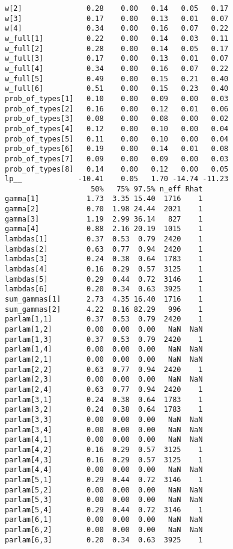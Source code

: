 \documentclass[
  12pt,
]{book}
\begin{document}
\begin{verbatim}
w[2]               0.28    0.00   0.14   0.05   0.17
w[3]               0.17    0.00   0.13   0.01   0.07
w[4]               0.34    0.00   0.16   0.07   0.22
w_full[1]          0.22    0.00   0.14   0.03   0.11
w_full[2]          0.28    0.00   0.14   0.05   0.17
w_full[3]          0.17    0.00   0.13   0.01   0.07
w_full[4]          0.34    0.00   0.16   0.07   0.22
w_full[5]          0.49    0.00   0.15   0.21   0.40
w_full[6]          0.51    0.00   0.15   0.23   0.40
prob_of_types[1]   0.10    0.00   0.09   0.00   0.03
prob_of_types[2]   0.16    0.00   0.12   0.01   0.06
prob_of_types[3]   0.08    0.00   0.08   0.00   0.02
prob_of_types[4]   0.12    0.00   0.10   0.00   0.04
prob_of_types[5]   0.11    0.00   0.10   0.00   0.04
prob_of_types[6]   0.19    0.00   0.14   0.01   0.08
prob_of_types[7]   0.09    0.00   0.09   0.00   0.03
prob_of_types[8]   0.14    0.00   0.12   0.00   0.05
lp__             -10.41    0.05   1.70 -14.74 -11.23
                    50%   75% 97.5% n_eff Rhat
gamma[1]           1.73  3.35 15.40  1716    1
gamma[2]           0.70  1.98 24.44  2021    1
gamma[3]           1.19  2.99 36.14   827    1
gamma[4]           0.88  2.16 20.19  1015    1
lambdas[1]         0.37  0.53  0.79  2420    1
lambdas[2]         0.63  0.77  0.94  2420    1
lambdas[3]         0.24  0.38  0.64  1783    1
lambdas[4]         0.16  0.29  0.57  3125    1
lambdas[5]         0.29  0.44  0.72  3146    1
lambdas[6]         0.20  0.34  0.63  3925    1
sum_gammas[1]      2.73  4.35 16.40  1716    1
sum_gammas[2]      4.22  8.16 82.29   996    1
parlam[1,1]        0.37  0.53  0.79  2420    1
parlam[1,2]        0.00  0.00  0.00   NaN  NaN
parlam[1,3]        0.37  0.53  0.79  2420    1
parlam[1,4]        0.00  0.00  0.00   NaN  NaN
parlam[2,1]        0.00  0.00  0.00   NaN  NaN
parlam[2,2]        0.63  0.77  0.94  2420    1
parlam[2,3]        0.00  0.00  0.00   NaN  NaN
parlam[2,4]        0.63  0.77  0.94  2420    1
parlam[3,1]        0.24  0.38  0.64  1783    1
parlam[3,2]        0.24  0.38  0.64  1783    1
parlam[3,3]        0.00  0.00  0.00   NaN  NaN
parlam[3,4]        0.00  0.00  0.00   NaN  NaN
parlam[4,1]        0.00  0.00  0.00   NaN  NaN
parlam[4,2]        0.16  0.29  0.57  3125    1
parlam[4,3]        0.16  0.29  0.57  3125    1
parlam[4,4]        0.00  0.00  0.00   NaN  NaN
parlam[5,1]        0.29  0.44  0.72  3146    1
parlam[5,2]        0.00  0.00  0.00   NaN  NaN
parlam[5,3]        0.00  0.00  0.00   NaN  NaN
parlam[5,4]        0.29  0.44  0.72  3146    1
parlam[6,1]        0.00  0.00  0.00   NaN  NaN
parlam[6,2]        0.00  0.00  0.00   NaN  NaN
parlam[6,3]        0.20  0.34  0.63  3925    1

\end{verbatim}
\end{document}
